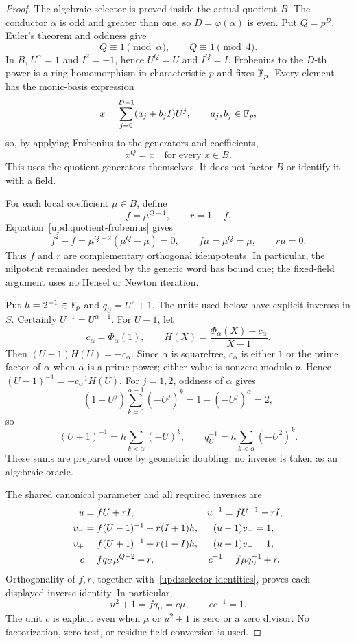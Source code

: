 \begin{proof}
The algebraic selector is proved inside the actual quotient $B$.  The
conductor $\alpha$ is odd and greater than one, so $D=\varphi(\alpha)$ is
even.  Put $Q=p^D$.  Euler's theorem and oddness give
\[
  Q\equiv1\pmod\alpha,\qquad Q\equiv1\pmod4.
\]
In $B$, $U^\alpha=1$ and $I^2=-1$, hence $U^Q=U$ and $I^Q=I$.  Frobenius
to the $D$-th power is a ring homomorphism in characteristic $p$ and fixes
$\mathbb F_p$.  Every element has the monic-basis expression
\[
  x=\sum_{j=0}^{D-1}(a_j+b_jI)U^j,
  \qquad a_j,b_j\in\mathbb F_p,
\]
so, by applying Frobenius to the generators and coefficients,
\begin{equation}
\label{upd:quotient-frobenius}
  x^Q=x\quad\text{for every }x\in B.
\end{equation}
This uses the quotient generators themselves.  It does not factor $B$ or
identify it with a field.

For each local coefficient $\mu\in B$, define
\[
  f=\mu^{Q-1},\qquad r=1-f.
\]
Equation~\eqref{upd:quotient-frobenius} gives
\begin{equation}
\label{upd:selector-identities}
  f^2-f=\mu^{Q-2}(\mu^Q-\mu)=0,\qquad
  f\mu=\mu^Q=\mu,\qquad r\mu=0.
\end{equation}
Thus $f$ and $r$ are complementary orthogonal idempotents.  In particular,
the nilpotent remainder needed by the generic word has bound one; the
fixed-field argument uses no Hensel or Newton iteration.

Put $h=2^{-1}\in\mathbb F_p$ and $q_U=U^2+1$.  The units used below have explicit
inverses in $S$.  Certainly $U^{-1}=U^{\alpha-1}$.  For $U-1$, let
\[
  c_\alpha=\Phi_\alpha(1),\qquad
  H(X)=\frac{\Phi_\alpha(X)-c_\alpha}{X-1}.
\]
Then $(U-1)H(U)=-c_\alpha$.  Since $\alpha$ is squarefree,
$c_\alpha$ is either $1$ or the prime factor of $\alpha$ when $\alpha$ is
a prime power; either value is nonzero modulo $p$.  Hence
$(U-1)^{-1}=-c_\alpha^{-1}H(U)$.  For $j=1,2$, oddness of $\alpha$ gives
\[
  (1+U^j)\sum_{k=0}^{\alpha-1}(-U^j)^k
      =1-(-U^j)^\alpha=2,
\]
so
\[
  (U+1)^{-1}=h\sum_{k<\alpha}(-U)^k,
  \qquad q_U^{-1}=h\sum_{k<\alpha}(-U^2)^k.
\]
These sums are prepared once by geometric doubling; no inverse is taken as
an algebraic oracle.

The shared canonical parameter and all required inverses are
\begin{align*}
  u&=fU+rI,& u^{-1}&=fU^{-1}-rI,\\
  v_-&=f(U-1)^{-1}-r(I+1)h,&
    &\hspace{-1em}(u-1)v_-=1,\\
  v_+&=f(U+1)^{-1}+r(1-I)h,&
    &\hspace{-1em}(u+1)v_+=1,\\
  c&=f q_U\mu^{Q-2}+r,&
  c^{-1}&=f\mu q_U^{-1}+r.
\end{align*}
Orthogonality of $f,r$, together with~\eqref{upd:selector-identities},
proves each displayed inverse identity.  In particular,
\begin{equation}
\label{upd:associated-q}
  u^2+1=fq_U=c\mu,\qquad cc^{-1}=1.
\end{equation}
The unit $c$ is explicit even when $\mu$ or $u^2+1$ is zero or a zero
divisor.  No factorization, zero test, or residue-field conversion is used.


\end{proof}
